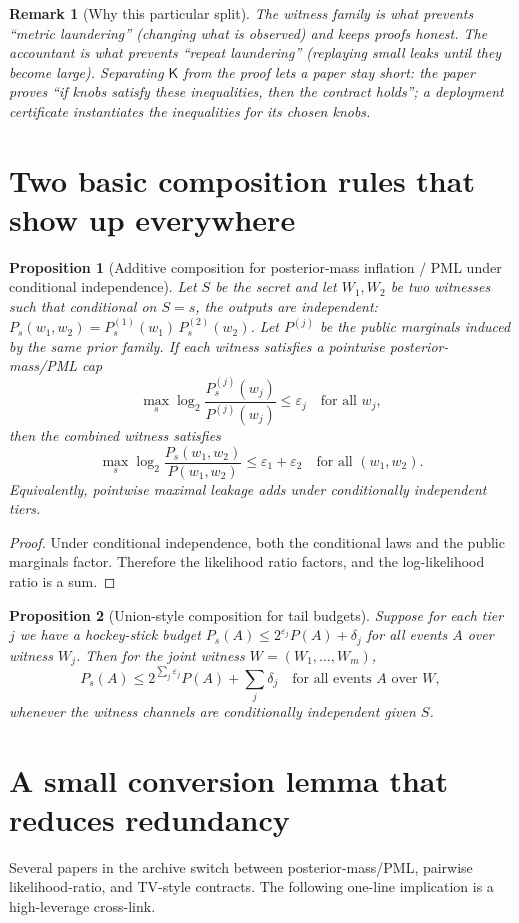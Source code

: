 \documentclass[11pt]{article}
\newtheorem{proposition}{Proposition}
\newtheorem{remark}{Remark}
\newcommand{\eps}{\varepsilon}
\newcommand{\logtwo}{\log_2}
\begin{document}
\begin{remark}[Why this particular split]
The witness family is what prevents ``metric laundering'' (changing what is observed) and keeps proofs honest.
The accountant is what prevents ``repeat laundering'' (replaying small leaks until they become large).
Separating $\mathsf K$ from the proof lets a paper stay short: the paper proves ``if knobs satisfy these inequalities, then the contract holds'';
a deployment certificate instantiates the inequalities for its chosen knobs.
\end{remark}

\section{Two basic composition rules that show up everywhere}
\begin{proposition}[Additive composition for posterior-mass inflation / PML under conditional independence]\label{prop:additive}
Let $S$ be the secret and let $W_1,W_2$ be two witnesses such that conditional on $S=s$,
the outputs are independent: $P_s(w_1,w_2)=P_s^{(1)}(w_1)\,P_s^{(2)}(w_2)$.
Let $P^{(j)}$ be the public marginals induced by the same prior family.
If each witness satisfies a pointwise posterior-mass/PML cap
\[
\max_s \logtwo\frac{P_s^{(j)}(w_j)}{P^{(j)}(w_j)}\le \eps_j \quad\text{for all } w_j,
\]
then the combined witness satisfies
\[
\max_s \logtwo\frac{P_s(w_1,w_2)}{P(w_1,w_2)}\le \eps_1+\eps_2
\quad\text{for all }(w_1,w_2).
\]
Equivalently, pointwise maximal leakage adds under conditionally independent tiers.
\end{proposition}

\begin{proof}
Under conditional independence, both the conditional laws and the public marginals factor.
Therefore the likelihood ratio factors, and the log-likelihood ratio is a sum.
\end{proof}

\begin{proposition}[Union-style composition for tail budgets]\label{prop:union}
Suppose for each tier $j$ we have a hockey-stick budget
$P_s(A)\le 2^{\eps_j}P(A)+\delta_j$ for all events $A$ over witness $W_j$.
Then for the joint witness $W=(W_1,\dots,W_m)$,
\[
P_s(A)\le 2^{\sum_j \eps_j}P(A)+\sum_j \delta_j
\quad\text{for all events }A \text{ over } W,
\]
whenever the witness channels are conditionally independent given $S$.
\end{proposition}

\section{A small conversion lemma that reduces redundancy}
Several papers in the archive switch between posterior-mass/PML, pairwise likelihood-ratio, and TV-style contracts.
The following one-line implication is a high-leverage cross-link.
\end{document}
